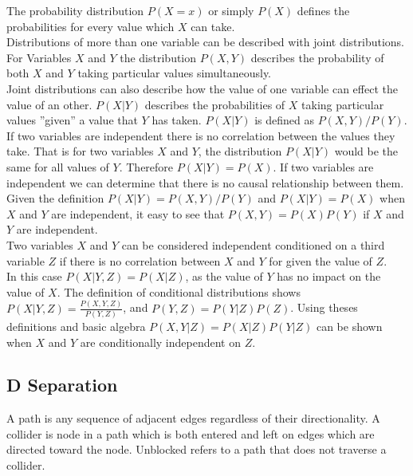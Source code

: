 \documentclass{article}
\begin{document}
The probability distribution $P(X=x)$ or simply $P(X)$ defines the probabilities for every value which $X$ can take. 
\\

Distributions of more than one variable can be described with joint distributions. For Variables $X$ and $Y$ the distribution $P(X,Y)$  describes the probability of both $X$ and $Y$ taking particular values simultaneously. 
\\

Joint distributions can also describe how the value of one variable can effect the value of an other. $P(X|Y)$ describes the probabilities of $X$ taking particular values ''given'' a value that $Y$ has taken. $P(X|Y)$ is defined as $P(X,Y)/P(Y)$.
\\

If two variables are independent there is no correlation between the values they take. That is for two variables $X$ and $Y$, the distribution $P(X|Y)$ would be the same for all values of $Y$. Therefore $P(X|Y) = P(X)$. If two variables are independent we can determine that there is no causal relationship between them.\\

Given the definition $P(X|Y) = P(X,Y)/P(Y)$ and $P(X|Y) = P(X)$ when $X$ and $Y$ are independent, it easy to see that $P(X,Y) = P(X)P(Y) $ if $X$ and $Y$ are independent.\\

Two variables $X$ and $Y$ can be considered independent conditioned on a third variable $Z$ if there is no correlation between $X$ and $Y$ for given the value of	 $Z$.\\

In this case $P(X|Y,Z) = P(X|Z)$, as the value of $Y$ has no impact on the value of $X$. The definition of conditional distributions shows $P(X|Y,Z) = \frac{P(X,Y,Z)}{P(Y,Z)}$, and $P(Y,Z) = P(Y|Z)P(Z)$. Using theses definitions and basic algebra $P(X,Y|Z) = P(X|Z)P(Y|Z)$ can be shown when $X$ and $Y$ are conditionally independent on $Z$.

\subsection{D Separation}

A path is any sequence of adjacent edges regardless of their directionality. A collider is node in a path which is both entered and left on edges which are directed toward the node. Unblocked refers to a path that does not traverse a collider\cite{pearl2003causality}.
\\
\begin{center}
\end{center}
\end{document}
